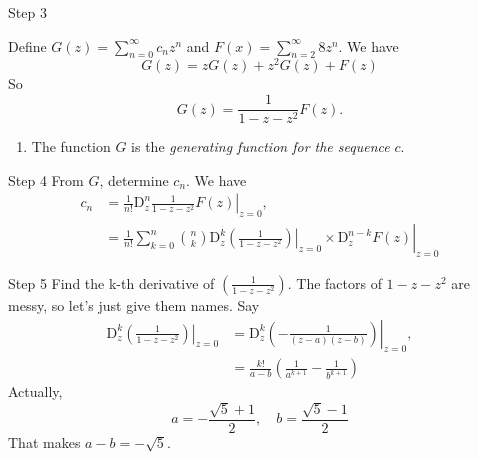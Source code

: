 \documentclass[portrait,fleqn,12pt]{beamer}
\newcommand{\D}{\mathrm{D}}
\newenvironment{handlist}
   {\begin{enumerate}[\faHandPointRight]
       \addtolength{\itemsep}{0.0\itemsep}}
     {\end{enumerate}}
\begin{document}
\begin{frame}{Step 3}

Define $G(z) =  \sum_{n=0}^\infty c_{n} z^n$ and $F(x) = \sum_{n=2}^\infty 8 z^n$. We have
\begin{equation}
  G(z) = z G(z) + z^2 G(z) + F(z)
\end{equation}
So 
\begin{equation}
  G(z) = \frac{1}{1-z-z^2} F(z).
\end{equation}

\begin{handlist}
\item The function $G$ is the \emph{generating function for the sequence} $c$.

\end{handlist}


\end{frame}
\begin{frame}{Step 4}
From $G$, determine $c_n$. We have
\begin{align*}
 c_n &= \frac{1}{n!}  \left. \D^n_z  \frac{1}{1-z-z^2} F(z) \right  \vert_{z=0}, \\
       &= \frac{1}{n!}  \left. \left. \sum_{k=0}^n \binom{n}{k} \D^k_z \left( \frac{1}{1-z-z^2} \right)  \right \vert_{z=0} \times \D^{n-k} _z F(z )  \right \vert_{z=0} 
\end{align*}

\end{frame}

\begin{frame}{Step 5}
Find the k-th derivative of $\left( \frac{1}{1-z-z^2} \right) $.   The factors of $1-z-z^2$ are messy, so let's just give them names. Say
\begin{align*}
   \left. \D^k_z \left( \frac{1}{1-z-z^2} \right) \right \vert_{z=0} &=  \left. \D^k_z \left( -\frac{1}{(z-a)(z-b)} \right)  \right \vert_{z=0}, \\
                                                                       &=   \frac{k!}{a-b} \left(\frac{1}{a^{k+1}} - \frac{1}{b^{k+1}} \right)
\end{align*}
Actually,
\[
   a =  -\frac{\sqrt{5}+1}{2}, \quad b = \frac{\sqrt{5}-1}{2}
\]
That makes $a-b = -\sqrt{5}$. 
\end{frame}
\end{document}
